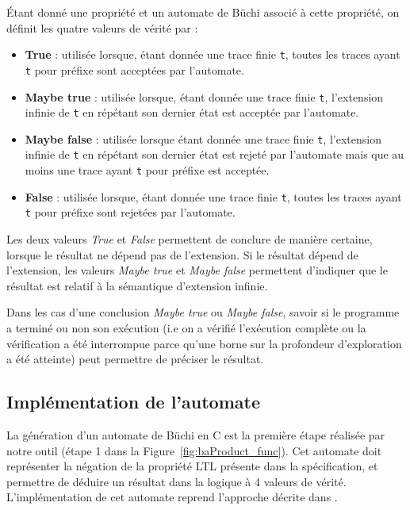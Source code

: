 Étant donné une propriété et un automate de Büchi associé à cette propriété, on
définit les quatre valeurs de vérité par :

\begin{itemize}
\item
  \textbf{True} : utilisée lorsque, étant donnée une trace finie \texttt{t},
  toutes les traces ayant \texttt{t} pour préfixe sont acceptées par
  l'automate.
\item
  \textbf{Maybe true} : utilisée lorsque, étant donnée une trace finie
  \texttt{t}, l'extension infinie de \texttt{t} en répétant son
  dernier état est acceptée par l'automate.
\item
  \textbf{Maybe false} : utilisée lorsque étant donnée une trace finie
  \texttt{t}, l'extension infinie de \texttt{t} en répétant son
  dernier état est rejeté par l'automate mais que au moins une trace
  ayant \texttt{t} pour préfixe est acceptée.
\item
  \textbf{False} : utilisée lorsque, étant donnée une trace finie \texttt{t},
  toutes les traces ayant \texttt{t} pour préfixe sont rejetées par
  l'automate.
\end{itemize}

Les deux valeurs \emph{True} et \emph{False} permettent de conclure de manière
certaine, lorsque le résultat ne dépend pas de l'extension. Si le résultat
dépend de l'extension, les valeurs \emph{Maybe true} et \emph{Maybe false}
permettent d'indiquer que le résultat est relatif à la sémantique d'extension
infinie.

Dans les cas d'une conclusion \emph{Maybe true} ou \emph{Maybe false},
savoir si le programme a terminé ou non son exécution (i.e on a vérifié
l'exécution complète ou la vérification a été interrompue parce qu'une borne sur
la profondeur d'exploration a été atteinte) peut permettre de préciser le résultat.

\subsection{Implémentation de l'automate}

La génération d'un automate de Büchi en C est la première étape réalisée par
notre outil (étape 1 dans la Figure~\ref{fig:baProduct_func}). Cet automate doit
représenter la négation de la propriété \ac{LTL} présente dans la spécification,
et permettre de déduire un résultat dans la logique à 4 valeurs de vérité.
L'implémentation de cet automate reprend l'approche décrite dans
\cite{morse_ltl}.

